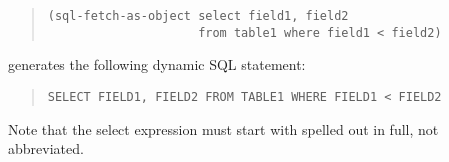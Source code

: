 \begin{quote}
\begin{verbatim}
(sql-fetch-as-object select field1, field2 
                     from table1 where field1 < field2)
\end{verbatim}
\end{quote}

generates the following dynamic SQL statement:

\begin{quote}
\begin{verbatim}
SELECT FIELD1, FIELD2 FROM TABLE1 WHERE FIELD1 < FIELD2
\end{verbatim}
\end{quote}

Note that the select expression must start with  spelled
out in full, not abbreviated.


